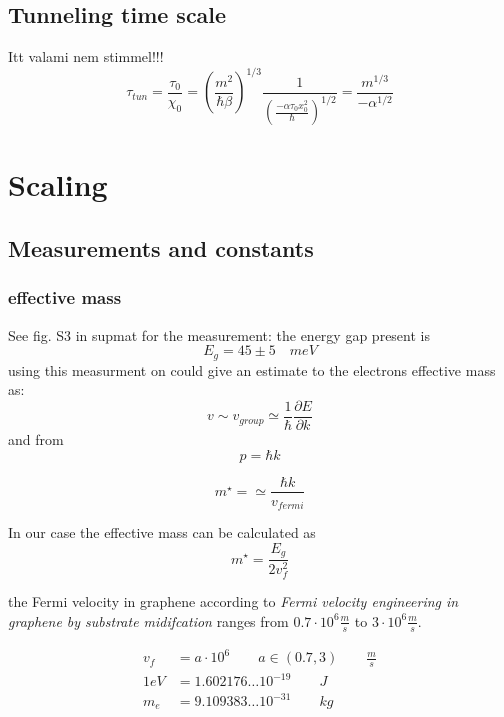 \documentclass[12pt,a4paper]{article}
\numberwithin{equation}{section}
\begin{document}
\subsection{Tunneling time scale}
Itt valami nem stimmel!!!
\begin{equation}
\tau_{tun} = \frac{\tau_0}{\chi_0} = \left( \frac{m^2 }{\hbar \beta} \right)^{1/3} \frac{1}{\left(\frac{-\alpha \tau_0 x_0^2}{\hbar}\right)^{1/2}} = \frac{m^{1/3}}{-\alpha^{1/2}}
\end{equation}

\newpage
\section{Scaling}
\subsection{Measurements and constants}
\subsubsection{effective mass}
See fig. S3 in supmat for the measurement: the energy gap present is
\begin{equation}
E_g = 45 \pm 5 \quad meV
\end{equation}
using this measurment on could give an estimate to the electrons effective mass as:
\begin{equation}
v \sim v_{group} \simeq \frac{1}{\hbar} \frac{\partial E}{\partial k}
\end{equation}
 and from 
 \begin{equation}
p = \hbar k 
 \end{equation}
 
 \begin{equation}
 m^\star = \simeq \frac{\hbar k}{v_{fermi}}
 \end{equation}
 
 In our case the effective mass can be calculated as
 \begin{equation}
 m^\star = \frac{E_g}{2 v_f^2}
 \end{equation}
 
 the Fermi velocity in graphene according to \textit{Fermi velocity engineering in graphene by substrate midifcation} ranges from $0.7 \cdot 10^6 \frac{m}{s}$ to $3\cdot 10^6 \frac{m}{s}$.
 
 \begin{align}
 v_f &= a\cdot 10^6 \qquad a\in (0.7, 3) \qquad \frac{m}{s} \\
 1 eV &= 1.602176\dots 10^{-19} \qquad J \\
 m_{e} &= 9.109383 \dots 10^{-31} \qquad kg\\
 \end{align}
 
\end{document}
